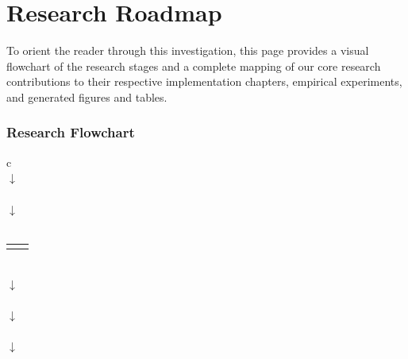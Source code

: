\documentclass[12pt, oneside, a4paper]{report}
\theoremstyle{definition}
\theoremstyle{remark}
\begin{document}

\cleardoublepage


\chapter*{Research Roadmap}

\noindent
To orient the reader through this investigation, this page provides a visual flowchart of the research stages and a complete mapping of our core research contributions to their respective implementation chapters, empirical experiments, and generated figures and tables.

\vspace{1.5cm}

\subsection*{Research Flowchart}

\begin{center}
\setlength{\tabcolsep}{12pt}
\renewcommand{\arraystretch}{1.2}
\begin{tabular}{c}
   \\
  $\downarrow$ \\
   \\
  $\downarrow$ \\
   \\
  \begin{tabular}{cc}
    \framebox[6.5cm]{Security Math (Chapter 7)} & \framebox[6.5cm]{Consensus Math (Chapter 8)} \\
  \end{tabular} \\
  $\downarrow$ \\
   \\
  $\downarrow$ \\
   \\
  $\downarrow$ \\
   \\
\end{tabular}
\end{center}
\end{document}
